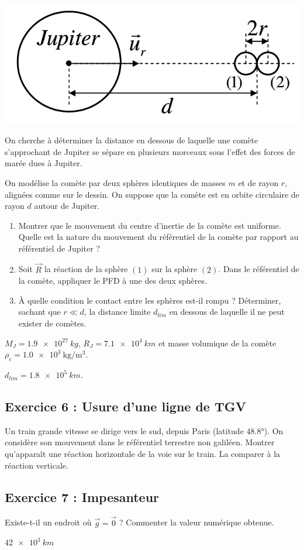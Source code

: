 \begin{minipage}[c]{\linewidth/2}
	\includegraphics[width=\linewidth]{Images/mp_s04_ex02.png}
\end{minipage}%
\begin{minipage}[c]{\linewidth/2}
	On cherche à déterminer la distance en dessous de laquelle une comète s'approchant de Jupiter se sépare en plusieurs morceaux sous l'effet des forces de marée dues à Jupiter.
	
	On modélise la comète par deux sphères identiques de masses $m$ et de rayon $r$, alignées comme sur le dessin. On suppose que la comète est en orbite circulaire de rayon $d$ autour de Jupiter.
\end{minipage} 

\begin{enumerate}
	\item Montrer que le mouvement du centre d'inertie de la comète est uniforme. Quelle est la nature du mouvement du référentiel de la comète par rapport au référentiel de Jupiter ?
	\item Soit $\vec{R}$ la réaction de la sphère $(1)$ sur la sphère $(2)$. Dans le référentiel de la comète, appliquer le PFD à une des deux sphères.
	\item À quelle condition le contact entre les sphères est-il rompu ? Déterminer, sachant que $r \ll d$, la distance limite $d_{lim}$ en dessous de laquelle il ne peut exister de comètes.
\end{enumerate}

 $M_J = \SI{1.9e27}{kg}$, $R_J = \SI{7.1e4}{km}$ et masse volumique de la comète $\rho_c = \SI{1.0e3}{\kilogram\per\cubic\metre}$.

 $d_{lim} = \SI{1.8e5}{km}$.

\subsection{Exercice 6 : Usure d'une ligne de TGV}

Un train grande vitesse se dirige vers le sud, depuis Paris (latitude $48.8$°). On considère son mouvement dans le référentiel terrestre non galiléen. Montrer qu'apparaît une réaction horizontale de la voie sur le train. La comparer à la réaction verticale. 


\subsection{Exercice 7 : Impesanteur}

Existe-t-il un endroit où $\vec{g} = \vec{0}$ ? Commenter la valeur numérique obtenue.

 $\SI{42e3}{km}$